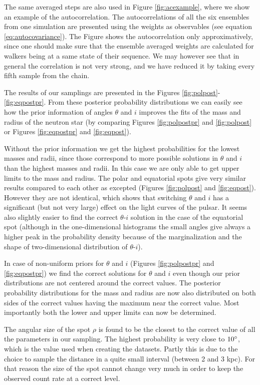 \documentclass{wihuri}
\begin{document}
The same averaged steps are also used in Figure \ref{fig:acexample}, where we show an example of the autocorrelation. The autocorrelations of all the six ensembles from one simulation are presented using the weights as observables (see equation \ref{eq:autocovariance}). The Figure shows the autocorrelation only approximatively, since one should make sure that the ensemble averaged weights are calculated for walkers being at a same state of their sequence. We may however see that in general the correlation is not very strong, and we have reduced it by taking every fifth sample from the chain.%

The results of our samplings are presented in the Figures \ref{fig:polpost}-\ref{fig:eqpostpr}. From these posterior probability distributions we can easily see how the prior information of angles $\theta$ and $i$ improves the fits of the mass and radius of the neutron star (by comparing Figures \ref{fig:polpostpr} and \ref{fig:polpost} or Figures \ref{fig:eqpostpr} and \ref{fig:eqpost}). 

Without the prior information we get the highest probabilities for the lowest masses and radii, since those correspond to more possible solutions in  $\theta$ and $i$ than the highest masses and radii. In this case we are only able to get upper limits to the mass and radius. The polar and equatorial spots give very similar results compared to each other as excepted (Figures \ref{fig:polpost} and \ref{fig:eqpost}). However they are not identical, which shows that switching $\theta$ and $i$ has a significant (but not very large) effect on the light curves of the pulsar. It seems also slightly easier to find the correct $\theta$-$i$ solution  in the case of the equatorial spot (although in the one-dimensional histograms the small angles give always a higher peak in the probability density because of the marginalization and the shape of two-dimensional distribution of $\theta$-$i$). 

In case of non-uniform priors for $\theta$ and $i$ (Figures \ref{fig:polpostpr} and \ref{fig:eqpostpr}) we find the correct solutions for $\theta$ and $i$ even though our prior distributions are not centered  around the correct values. The posterior probability distributions for the mass and radius are now also distributed on both sides of the correct values having the maximum near the correct value. Most importantly both the lower and upper limits can now be determined. 

The angular size of the spot $\rho$ is found to be the closest to the correct value of all the  parameters in our sampling. The highest probability is very close to $10 \degree$, which is the value used when creating the datasets. Partly this is due to the choice to sample the distance in a quite small interval (between 2 and 3 kpc). For that reason the size of the spot cannot change very much in order to keep the observed count rate at a correct level. 
\end{document}
